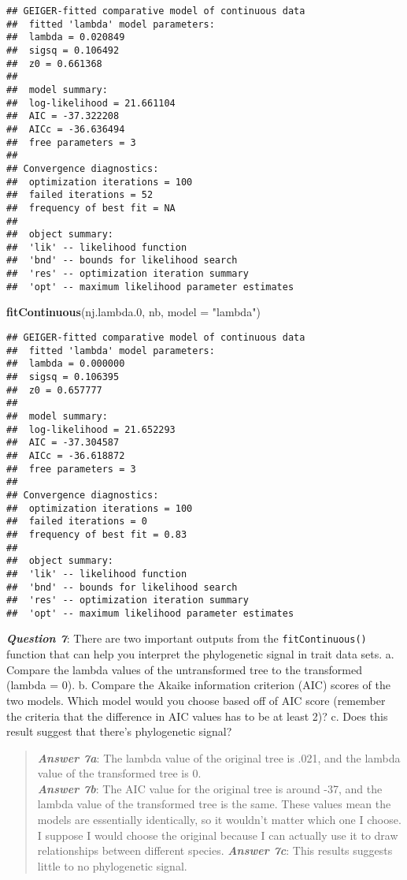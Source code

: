 \documentclass[]{article}
\newenvironment{Shaded}{\begin{snugshade}}{\end{snugshade}}
\newcommand{\KeywordTok}[1]{\textcolor[rgb]{0.13,0.29,0.53}{\textbf{#1}}}
\newcommand{\DataTypeTok}[1]{\textcolor[rgb]{0.13,0.29,0.53}{#1}}
\newcommand{\DecValTok}[1]{\textcolor[rgb]{0.00,0.00,0.81}{#1}}
\newcommand{\StringTok}[1]{\textcolor[rgb]{0.31,0.60,0.02}{#1}}
\newcommand{\NormalTok}[1]{#1}
\begin{document}
\begin{verbatim}
## GEIGER-fitted comparative model of continuous data
##  fitted 'lambda' model parameters:
##  lambda = 0.020849
##  sigsq = 0.106492
##  z0 = 0.661368
## 
##  model summary:
##  log-likelihood = 21.661104
##  AIC = -37.322208
##  AICc = -36.636494
##  free parameters = 3
## 
## Convergence diagnostics:
##  optimization iterations = 100
##  failed iterations = 52
##  frequency of best fit = NA
## 
##  object summary:
##  'lik' -- likelihood function
##  'bnd' -- bounds for likelihood search
##  'res' -- optimization iteration summary
##  'opt' -- maximum likelihood parameter estimates
\end{verbatim}

\begin{Shaded}
\begin{Highlighting}[]
\KeywordTok{fitContinuous}\NormalTok{(nj.lambda.}\DecValTok{0}\NormalTok{, nb, }\DataTypeTok{model =} \StringTok{"lambda"}\NormalTok{)}
\end{Highlighting}
\end{Shaded}

\begin{verbatim}
## GEIGER-fitted comparative model of continuous data
##  fitted 'lambda' model parameters:
##  lambda = 0.000000
##  sigsq = 0.106395
##  z0 = 0.657777
## 
##  model summary:
##  log-likelihood = 21.652293
##  AIC = -37.304587
##  AICc = -36.618872
##  free parameters = 3
## 
## Convergence diagnostics:
##  optimization iterations = 100
##  failed iterations = 0
##  frequency of best fit = 0.83
## 
##  object summary:
##  'lik' -- likelihood function
##  'bnd' -- bounds for likelihood search
##  'res' -- optimization iteration summary
##  'opt' -- maximum likelihood parameter estimates
\end{verbatim}

\textbf{\emph{Question 7}}: There are two important outputs from the
\texttt{fitContinuous()} function that can help you interpret the
phylogenetic signal in trait data sets. a. Compare the lambda values of
the untransformed tree to the transformed (lambda = 0). b. Compare the
Akaike information criterion (AIC) scores of the two models. Which model
would you choose based off of AIC score (remember the criteria that the
difference in AIC values has to be at least 2)? c. Does this result
suggest that there's phylogenetic signal?

\begin{quote}
\textbf{\emph{Answer 7a}}: The lambda value of the original tree is
.021, and the lambda value of the transformed tree is 0.\\
\textbf{\emph{Answer 7b}}: The AIC value for the original tree is around
-37, and the lambda value of the transformed tree is the same. These
values mean the models are essentially identically, so it wouldn't
matter which one I choose. I suppose I would choose the original because
I can actually use it to draw relationships between different species.
\textbf{\emph{Answer 7c}}: This results suggests little to no
phylogenetic signal.
\end{quote}
\end{document}
